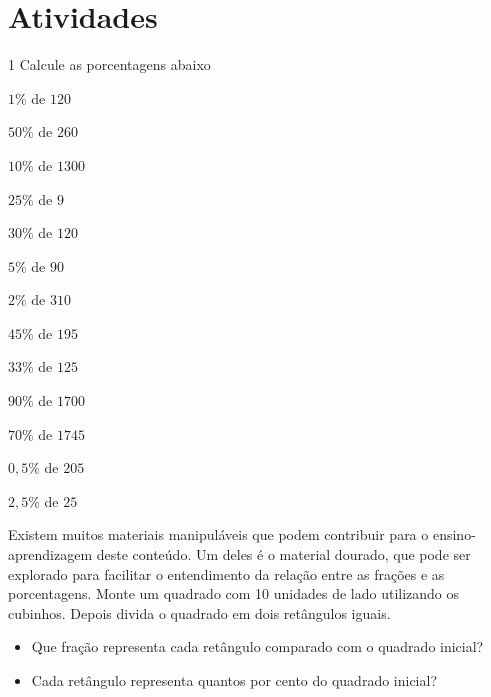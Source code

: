 \section{Atividades}

\num{1}  Calcule as porcentagens abaixo

\begin{escolha}
\item $1\%$ de $120$ 
\item $50\%$ de $260$ 
\item $10\%$ de $1300$ 
\item $25\%$ de $9$ 
\item $30\%$ de $120$ 
\item $5\%$ de $90$ 
\item $2\%$ de $310$ 
\item $45\%$ de $195$ 
\item $33\%$ de $125$ 
\item $90\%$ de $1700$ 
\item $70\%$ de $1745$ 
\item $0,5\%$ de $205$ 
\item $2,5\%$ de $25$ 
\end{escolha}

\noindent Existem muitos materiais manipuláveis que podem contribuir para o
ensino-aprendizagem deste conteúdo. Um deles é o material dourado, que
pode ser explorado para facilitar o entendimento da relação entre as
frações e as porcentagens. Monte um quadrado com 10 unidades de lado utilizando os cubinhos. Depois divida o quadrado em dois retângulos iguais. 

\begin{itemize}
\item Que fração representa cada retângulo comparado com o quadrado inicial?
\item Cada retângulo representa quantos por cento do quadrado inicial?
\end{itemize}


